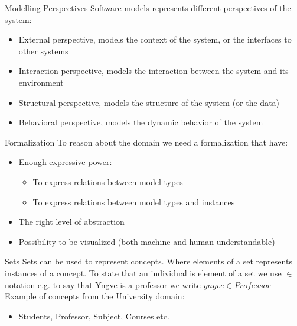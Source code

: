 \documentclass[slidetop,mathserif,red]{beamer}
\begin{document}
\begin{frame}{Modelling Perspectives}
    Software models represents different perspectives of the system:


        \begin{itemize}
        \item External perspective, models the context of the system, or the interfaces to other systems 

        \item Interaction perspective, models the interaction between the system and its environment

        \item Structural perspective, models the structure of the system (or the data)

        \item Behavioral perspective, models the dynamic behavior of the system
        \end{itemize}
\end{frame}





\begin{frame}{Formalization}
To reason about the domain we need a formalization that have:
\begin{itemize}
\item Enough expressive power:
	\begin{itemize}
	\item To express relations between model types
	\item To express relations between model types and instances
	\end{itemize}
\item The right level of abstraction
\item Possibility to be visualized (both machine and human understandable)
\end{itemize} 
\end{frame}

\begin{frame}{Sets}
Sets can be used to represent concepts. Where elements of a set represents instances of a concept.  To state that an individual is element of a set we use $\in$ notation e.g. to say that Yngve is a professor we write $yngve \in Professor$\\
Example of concepts from the University domain:
\begin{itemize}
\item Students, Professor, Subject, Courses etc. 
\end{itemize} 


\end{frame}
\end{document}
